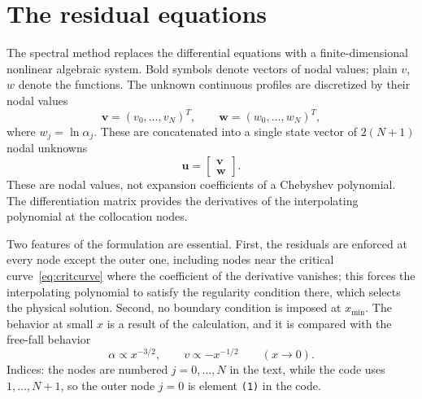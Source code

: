 \documentclass[11pt,a4paper]{article}
\begin{document}
\section{The residual equations}\label{sec:residuals}

The spectral method \cite{trefethen2000,boyd2001} replaces
the differential equations with a finite-dimensional nonlinear algebraic
system. Bold symbols denote vectors of nodal values; plain $v$, $w$
denote the functions. The unknown continuous profiles are discretized by
their nodal values
\begin{equation}
\mathbf v=(v_0,\ldots,v_N)^T,
\qquad
\mathbf w=(w_0,\ldots,w_N)^T,
\end{equation}
where $w_j=\ln\alpha_j$. These are concatenated into a single state vector
of $2(N+1)$ nodal unknowns
\begin{equation}
\mathbf u=
\begin{bmatrix}
\mathbf v\\
\mathbf w
\end{bmatrix}.
\label{eq:statevector}
\end{equation}
These are nodal values, not expansion coefficients of a Chebyshev
polynomial. The differentiation matrix provides the derivatives of the
interpolating polynomial at the collocation nodes.

Two features of the formulation are essential. First, the residuals are
enforced at every node except the outer one, including nodes near the
critical curve~\eqref{eq:critcurve} where the coefficient of the
derivative vanishes; this forces the interpolating polynomial to satisfy
the regularity condition there, which selects the physical solution.
Second, no boundary condition is imposed at $x_{\min}$. The behavior at
small $x$ is a result of the calculation, and it is compared with the
free-fall behavior
\begin{equation}
\alpha\propto x^{-3/2},
\qquad
v\propto-x^{-1/2}
\qquad
(x\rightarrow0).
\label{eq:freefallbehavior}
\end{equation}
Indices: the nodes are numbered $j=0,\ldots,N$ in the text, while the
code uses $1,\ldots,N+1$, so the outer node $j=0$ is element \texttt{(1)}
in the code.

\end{document}
